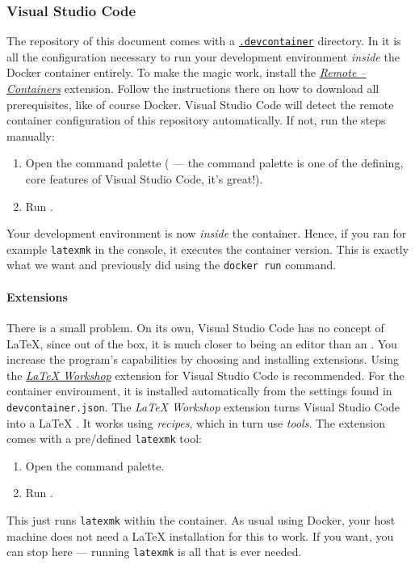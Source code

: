 \subsubsection{Visual Studio Code}

The repository of this document comes with a \href{https://github.com/microsoft/vscode-dev-containers}{\texttt{.devcontainer}} directory.
In it is all the configuration necessary to run your development environment \emph{inside} the Docker container entirely.
To make the magic work, install the \href{https://marketplace.visualstudio.com/items?itemName=ms-vscode-remote.remote-containers}{\emph{Remote -- Containers}} extension.
Follow the instructions there on how to download all prerequisites, like of course Docker.
Visual Studio Code will detect the remote container configuration of this repository automatically.
If not, run the steps manually:
\begin{enumerate}
    \item Open the command palette ( --- the command palette is one of the defining, core features of Visual Studio Code, it's great!).
    \item Run .
\end{enumerate}
Your development environment is now \emph{inside} the container.
Hence, if you ran for example \texttt{latexmk} in the console, it executes the container version.
This is exactly what we want and previously did using the \texttt{docker run} command.

\paragraph{Extensions}
There is a small problem.
On its own, Visual Studio Code has no concept of \LaTeX{}, since out of the box, it is much closer to being an editor than an .
You increase the program's capabilities by choosing and installing extensions.
Using the \href{https://marketplace.visualstudio.com/items?itemName=James-Yu.latex-workshop}{\emph{LaTeX Workshop}} extension for Visual Studio Code is recommended.
For the container environment, it is installed automatically from the settings found in \texttt{devcontainer.json}.
The \emph{LaTeX Workshop} extension turns Visual Studio Code into a \LaTeX{} .
It works using \emph{recipes}, which in turn use \emph{tools}.
The extension comes with a pre\-/defined \texttt{latexmk} tool:
\begin{enumerate}
    \item Open the command palette.
    \item Run .
\end{enumerate}
This just runs \texttt{latexmk} within the container.
As usual using Docker, your host machine does not need a \LaTeX{} installation for this to work.
If you want, you can stop here --- running \texttt{latexmk} is all that is ever needed.

